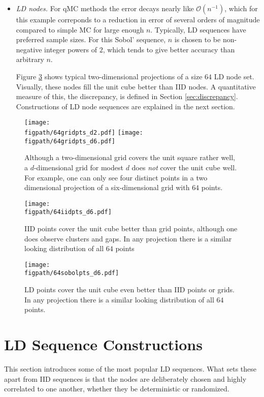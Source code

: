 \documentclass{svproc}
\newcommand{\figpath}{Figures}
\begin{document}
\begin{itemize}
	\item \emph{LD nodes.}  For qMC methods the error decays nearly like $\mathcal{O}(n^{-1})$, which for this example correponds to a reduction in error of several orders of magnitude compared to simple MC for large enough $n$.  Typically, LD sequences have preferred sample sizes.  For this Sobol' sequence, $n$ is chosen to be non-negative integer powers of $2$, which tends to give better accuracy than arbitrary $n$.

	Figure \ref{fig:ld} shows typical two-dimensional projections of a size $64$ LD node set.  Visually, these nodes fill the unit cube better than IID nodes.  A quantitative measure of this, the discrepancy, is defined in Section \ref{sec:discrepancy}.  Constructions of LD node sequences are explained in the next section.

\end{itemize}

\begin{figure}
	\centering
	\texttt{[image: \\figpath/64gridpts\_d2.pdf]}\quad
	\texttt{[image: \\figpath/64gridpts\_d6.pdf]}
	\caption{Although a two-dimensional grid covers the unit square rather well, a $d$-dimensional grid for modest $d$ does \emph{not} cover the unit cube well.  For example, one can only see four distinct points in a two dimensional projection of a six-dimensional grid with $64$ points. \label{fig:grid}}
\end{figure}

\begin{figure}
	\centering
	\texttt{[image: \\figpath/64iidpts\_d6.pdf]}
	\caption{IID points cover the unit cube better than grid points, although one does observe clusters and gaps.  In any  projection there is  a similar looking distribution of all $64$ points \label{fig:iid}}
\end{figure}

\begin{figure}
	\centering
	\texttt{[image: \\figpath/64sobolpts\_d6.pdf]}
	\caption{LD points cover the unit cube even better than IID points or grids.  In any  projection there is  a similar looking distribution of all $64$ points. \label{fig:ld}}
\end{figure}


\section{LD Sequence Constructions} \label{sec:construct}
This section introduces some of the most popular LD sequences.  What sets these apart from IID sequences is that the nodes are deliberately chosen and highly correlated to one another, whether they be deterministic or randomized.
\end{document}
